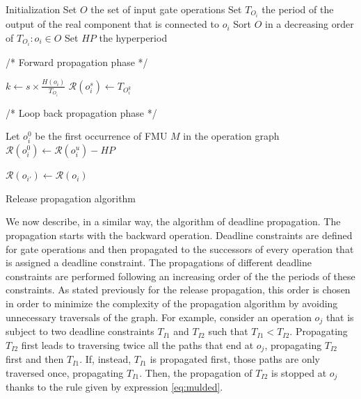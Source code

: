 \begin{algorithm}[!htp]	
	 Initialization\;
	 Set $O$ the set of input gate operations\;
	 Set $T_{O_i}$ the period of the output of the real component that is connected to $o_i$\;
	 Sort $O$ in a decreasing order of $T_{O_i}: o_i \in O$\;
	 Set $HP$ the hyperperiod\;
	
	/* Forward propagation phase */
	
	{
		{
		  $k \leftarrow s \times \frac{H(o_i)}{T_{O_i}}$\;
			$\mathcal{R}(o_i^s) \leftarrow T_{O_i^k}$\;
			\;	
		}
	}
	
	/* Loop back propagation phase */
	
	{
		  Let $o_i^0$ be the first occurrence of FMU $M$ in the operation graph\;
			$\mathcal{R}(o_i^0) \leftarrow \mathcal{R}(o_i^u) - HP$\;
			\;	
	}
		
		{
			{
				{
					$\mathcal{R}(o_{i'}) \leftarrow \mathcal{R}(o_i)$\;
					\;
				}
			}
			\KwRet\;
		}
	\caption{Release propagation algorithm}
	\label{algo:release}
\end{algorithm} 

We now describe, in a similar way, the algorithm of deadline propagation. The propagation starts with the backward operation. Deadline constraints are defined for gate operations and then propagated to the successors of every operation that is assigned a deadline constraint. The propagations of different deadline constraints are performed following an increasing order of the the periods of these constraints. As stated previously for the release propagation, this order is chosen in order to minimize the complexity of the propagation algorithm by avoiding unnecessary traversals of the graph. For example, consider an operation $o_j$ that is subject to two deadline constraints $T_{I1}$ and $T_{I2}$ such that $T_{I1} < T_{I2}$. Propagating $T_{I2}$ first leads to traversing twice all the paths that end at $o_j$, propagating $T_{I2}$ first and then $T_{I1}$. If, instead, $T_{I1}$ is propagated first, those paths are only traversed once, propagating $T_{I1}$. Then, the propagation of $T_{I2}$ is stopped at $o_j$ thanks to the rule given by expression \ref{eq:mulded}.

